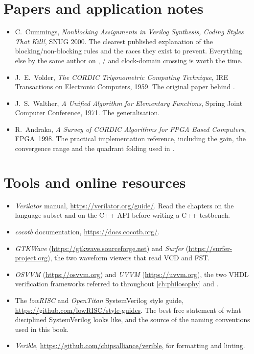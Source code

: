 \section*{Papers and application notes}

\begin{itemize}
  \item C.~Cummings, \emph{Nonblocking Assignments in Verilog Synthesis, Coding
        Styles That Kill!}, SNUG 2000. The clearest published explanation of
        the blocking/non-blocking rules and the races they exist to prevent.
        Everything else by the same author on ,
        / and clock-domain crossing is worth the
        time.
  \item J.~E.~Volder, \emph{The CORDIC Trigonometric Computing Technique},
        IRE Transactions on Electronic Computers, 1959. The original paper
        behind .
  \item J.~S.~Walther, \emph{A Unified Algorithm for Elementary Functions},
        Spring Joint Computer Conference, 1971. The generalisation.
  \item R.~Andraka, \emph{A Survey of CORDIC Algorithms for FPGA Based
        Computers}, FPGA~1998. The practical implementation reference,
        including the gain, the convergence range and the quadrant folding
        used in .
\end{itemize}

\section*{Tools and online resources}

\begin{itemize}
  \item \emph{Verilator} manual, \url{https://verilator.org/guide/}. Read the
        chapters on the language subset and on the C++ API before writing a
        C++ testbench.
  \item \emph{cocotb} documentation, \url{https://docs.cocotb.org/}.
  \item \emph{GTKWave} (\url{https://gtkwave.sourceforge.net}) and
        \emph{Surfer} (\url{https://surfer-project.org}), the two waveform
        viewers that read VCD and FST.
  \item \emph{OSVVM} (\url{https://osvvm.org}) and \emph{UVVM}
        (\url{https://uvvm.org}), the two VHDL verification frameworks
        referred to throughout \cref{ch:philosophy} and .
  \item The \emph{lowRISC} and \emph{OpenTitan} SystemVerilog style guide,
        \url{https://github.com/lowRISC/style-guides}. The best free
        statement of what disciplined SystemVerilog looks like, and the
        source of the naming conventions used in this book.
  \item \emph{Verible}, \url{https://github.com/chipsalliance/verible}, for
        formatting and linting.
\end{itemize}
